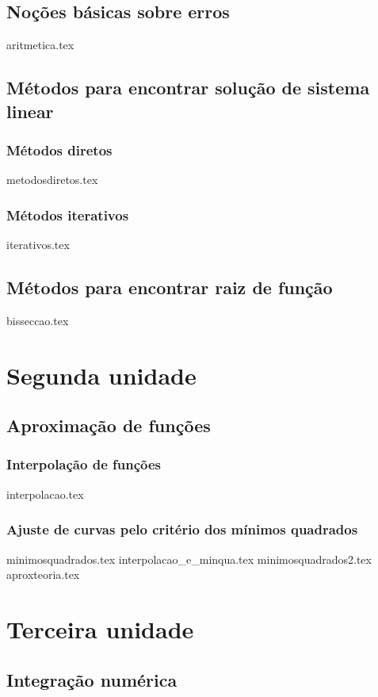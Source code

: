 \documentclass[10pt,a4paper]{report}
\theoremstyle{definition}
\begin{document}
\chapter{Noções básicas sobre erros}\label{ch.erros}
{aritmetica.tex}
\chapter{Métodos para encontrar solução de sistema linear}\label{ch.sl}
	\section{Métodos diretos}
{metodosdiretos.tex}
	\section{Métodos iterativos}
{iterativos.tex}
\chapter{Métodos para encontrar raiz de função}\label{ch.funcao}
{bisseccao.tex}


\part{Segunda unidade}
\chapter{Aproximação de funções}

	\section{Interpolação de funções}
	{interpolacao.tex}
	\section{Ajuste de curvas pelo critério dos mínimos quadrados}
	{minimosquadrados.tex}
	{interpolacao_e_minqua.tex}
	{minimosquadrados2.tex}
	{aproxteoria.tex}
\part{Terceira unidade}
\chapter{Integração numérica}
\end{document}
